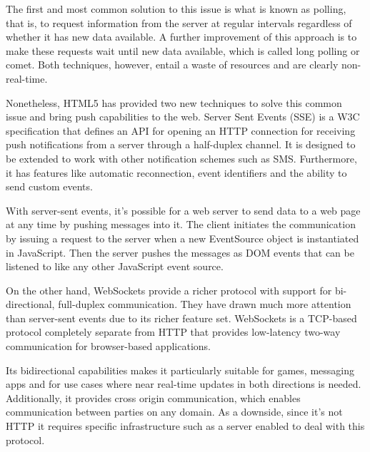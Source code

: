 The first and most common solution to this issue is what is known as polling, that is, to request information from the server at regular intervals regardless of whether it has new data available. A further improvement of this approach is to make these requests wait until new data available, which is called long polling or comet. Both techniques, however, entail a waste of resources and are clearly non-real-time.

Nonetheless, HTML5 has provided two new techniques to solve this common issue and bring push capabilities to the web. Server Sent Events (SSE) is a W3C specification \cite{SSE} that defines an API for opening an HTTP connection for receiving push notifications from a server through a half-duplex channel. It is designed to be extended to work with other notification schemes such as SMS. Furthermore, it has features like automatic reconnection, event identifiers and the ability to send custom events.

With server-sent events, it's possible for a web server to send data to a web page at any time by pushing messages into it. The client initiates the communication by issuing a request to the server when a new EventSource object is instantiated in JavaScript. Then the server pushes the messages as DOM events that can be listened to like any other JavaScript event source.

On the other hand, WebSockets provide a richer protocol with support for bi-directional, full-duplex communication. They have drawn much more attention than server-sent events due to its richer feature set. WebSockets is a TCP-based protocol \cite{WS} completely separate from HTTP that provides low-latency two-way communication for browser-based applications.

Its bidirectional capabilities makes it particularly suitable for games, messaging apps and for use cases where near real-time updates in both directions is needed. Additionally, it provides cross origin communication, which enables communication between parties on any domain. As a downside, since it's not HTTP it requires specific infrastructure such as a server enabled to deal with this protocol.

